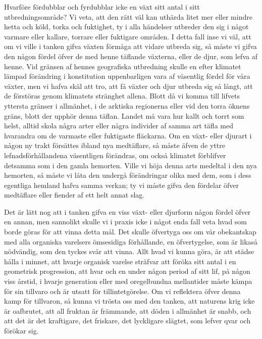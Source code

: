 Hvarföre fördubblar och fyrdubblar icke en växt sitt antal i sitt utbredningsområde? Vi veta, att den rätt väl kan uthärda litet mer eller mindre hetta och köld, torka och fuktighet, ty i alla händelser utbreder den sig i något varmare eller kallare, torrare eller fuktigare områden. I detta fall inse vi väl, att om vi ville i tanken gifva växten förmåga att vidare utbreda sig, så måste vi gifva den någon fördel öfver de med henne täflande växterna, eller de djur, som lefva af henne. Vid gränsen af hennes geografiska utbredning skulle en efter klimatet lämpad förändring i konstitution uppenbarligen vara af väsentlig fördel för våra växter, men vi hafva skäl att tro, att få växter och djur utbreda sig så långt, att de förstöras genom klimatets stränghet allena. Blott då vi komma till lifvets yttersta gränser i allmänhet, i de arktiska regionerna eller vid den torra öknens gräns, blott der upphör denna täflan. Landet må vara hur kallt och torrt som helst, alltid skola några arter eller några individer af samma art täfla med hvarandra om de varmaste eller fuktigaste fläckarna.
Om en växt- eller djurart i någon ny trakt försättes ibland nya medtäflare, så måste äfven de yttre lefnadsförhållandena väsentligen förändras, om också klimatet förblifver detsamma som i den gamla hemorten. Ville vi höja denna arts medeltal i den nya hemorten, så måste vi låta den undergå förändringar olika med dem, som i dess egentliga hemland hafva samma verkan; ty vi måste gifva den fördelar öfver medtäflare eller fiender af ett helt annat slag.

Det är lätt nog att i tanken gifva en viss växt- eller djurform någon fördel öfver en annan, men sannolikt skulle vi i praxis icke i något enda fall veta hvad som borde göras för att vinna detta mål. Det skulle öfvertyga oss om vår obekantskap med alla organiska varelsers ömsesidiga förhållande, en öfvertygelse, som är likaså nödvändig, som den tyckes svår att vinna. Allt hvad vi kunna göra, är att städse hålla i minnet, att hvarje organisk varelse sträfvar att föröka sitt antal i en geometrisk progression, att hvar och en under någon period af sitt lif, på någon viss årstid, i hvarje generation eller med oregelbundna mellantider måste kämpa för sin tillvaro och är utsatt för tillintetgörelse. Om vi reflektera öfver denna kamp för tillvaron, så kunna vi trösta oss med den tanken, att naturens krig icke är oafbrutet, att all fruktan är främmande, att döden i allmänhet är snabb, och att det är det kraftigare, det friskare, det lyckligare slägtet, som lefver qvar och förökar sig.


